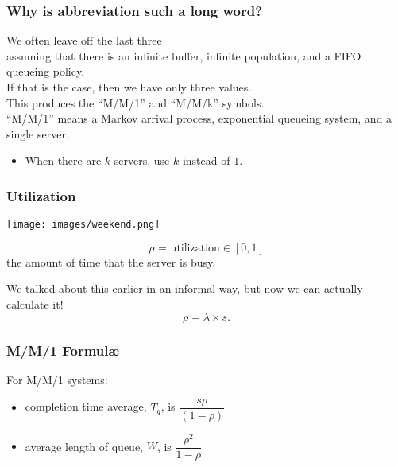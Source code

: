 \begin{frame}
\frametitle{Why is abbreviation such a long word?}

\large
\begin{changemargin}{1.5cm}
We often leave off the last three\\
assuming that there is an infinite buffer, infinite population, and a FIFO queueing policy. \\[1em]

If that is the case, then we have only three values. \\[1em]

This produces the ``M/M/1'' and ``M/M/k'' symbols. \\[1em]

``M/M/1'' means a Markov arrival process, exponential queueing system, and a single server. \\

\begin{itemize}
\item When there are $k$ servers, use $k$ instead of $1$.
\end{itemize}
\end{changemargin}

\end{frame}



\begin{frame}
\frametitle{Utilization}

\begin{center}
	\texttt{[image: images/weekend.png]}
\end{center}

\large
\begin{changemargin}{1.5cm}
\[ \rho \text{ = utilization} \in [0, 1]\]
the amount of time that the server is busy. 

We talked about this earlier in an informal way, but now we can actually calculate it! \\[-1em]

\[ \rho = \lambda \times s.\]
\end{changemargin}

\end{frame}



\begin{frame}
\frametitle{M/M/1 Formul\ae}

\large
\begin{changemargin}{1.5cm}
For M/M/1 systems: \\[0em]

\begin{itemize}
\item completion time average, $T_{q}$, is $\dfrac{s\rho}{(1-\rho)}$
\item average length of queue, $W$, is $\dfrac{\rho^{2}}{1-\rho}$
\end{itemize}
\end{changemargin}
\end{frame}



